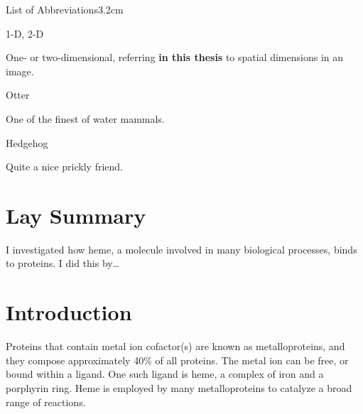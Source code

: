 \documentclass[a4paper, nobind]{templates/ociamthesis}
\begin{document}
\begin{romanpages}
\begin{mclistof}{List of Abbreviations}{3.2cm}
\item[1-D, 2-D]

One- or two-dimensional, referring \textbf{in this thesis} to spatial dimensions in an image.

\item[Otter]

One of the finest of water mammals.

\item[Hedgehog]

Quite a nice prickly friend.

\end{mclistof} 


\end{romanpages}

\flushbottom

\hypertarget{lay-summary}{%
\chapter*{Lay Summary}\label{lay-summary}}

\adjustmtc
{}

I investigated how heme, a molecule involved in many biological processes, binds to proteins. I did this by\ldots{}

\hypertarget{introduction}{%
\chapter*{Introduction}\label{introduction}}

\adjustmtc
{}

Proteins that contain metal ion cofactor(s) are known as metalloproteins, and they compose approximately 40\% of all proteins. The metal ion can be free, or bound within a ligand. One such ligand is heme, a complex of iron and a porphyrin ring. Heme is employed by many metalloproteins to catalyze a broad range of reactions.
\end{document}
